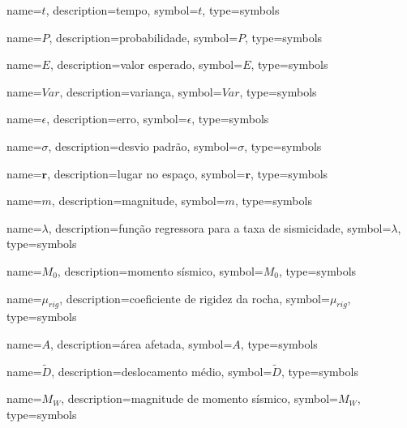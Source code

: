 
{
	name={\ensuremath{t}},
	description={tempo},
	symbol={\ensuremath{t}},
	type=symbols
}

{
	name={\ensuremath{P}},
	description={probabilidade},
	symbol={\ensuremath{P}},
	type=symbols
}

{
	name={\ensuremath{E}},
	description={valor esperado},
	symbol={\ensuremath{E}},
	type=symbols
}

{
	name={\ensuremath{Var}},
	description={variança},
	symbol={\ensuremath{Var}},
	type=symbols
}

{
	name={\ensuremath{\epsilon}},
	description={erro},
	symbol={\ensuremath{\epsilon}},
	type=symbols
}

{
	name={\ensuremath{\sigma}},
	description={desvio padrão},
	symbol={\ensuremath{\sigma}},
	type=symbols
}


{
	name={\ensuremath{\boldsymbol{r}}},
	description={lugar no espaço},
	symbol={\ensuremath{\boldsymbol{r}}},
	type=symbols
}


{
	name={\ensuremath{m}},
	description={magnitude},
	symbol={\ensuremath{m}},
	type=symbols
}


{
	name={\ensuremath{\lambda}},
	description={função regressora para a taxa de sismicidade},
	symbol={\ensuremath{\lambda}},
	type=symbols
}

{
	name={\ensuremath{M_0}},
	description={momento sísmico},
	symbol={\ensuremath{M_0}},
	type=symbols
}


{
	name={\ensuremath{\mu_{rig}}},
	description={coeficiente de rigidez da rocha},
	symbol={\ensuremath{\mu_{rig}}},
	type=symbols
}


{
	name={\ensuremath{A}},
	description={área afetada},
	symbol={\ensuremath{A}},
	type=symbols
}


{
	name={\ensuremath{\tilde{D}}},
	description={deslocamento médio},
	symbol={\ensuremath{\tilde{D}}},
	type=symbols
}


{
	name={\ensuremath{M_W}},
	description={magnitude de momento sísmico},
	symbol={\ensuremath{M_W}},
	type=symbols
}

